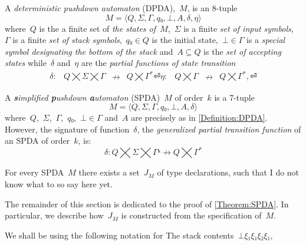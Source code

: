 \begin{Definition}
  \label{Definition:DPDA}
  A \emph{deterministic pushdown automaton} (DPDA),~$M$, is an 8-tuple
  \[
    M =⟨Q,Σ,Γ, q₀,⊥, A,δ,η⟩
  \]
  where~$Q$ is the a finite set of
  \emph{the states of~$M$},~$Σ$ is a finite
  \emph{set of input symbols},~$Γ$ is a finite
  \emph{set of stack symbols},~$q₀∈Q$ is the initial state,~$⊥∈Γ$
  is a \emph{special symbol designating the bottom of the stack}
  and~$A⊆Q$ is the \emph{set of accepting states} while~$δ$ and~$η$ are
  the \emph{partial functions of state transition}
  \[
    \begin{array}{crlc}
      δ: & Q⨉Σ⨉Γ &↛& Q⨉Γ^*⏎
      η: & Q⨉Γ &↛& Q⨉Γ^*,⏎
    \end{array}
  \]
\end{Definition}

\begin{Definition}
  \label{Definition:SPDA}
  A \emph{\textbf simplified \textbf pushdown \textbf automaton} (SPDA)~$M$ of order~$k$ is a 7-tuple
  \[
    M =⟨Q,Σ,Γ,q₀,⊥, A,δ⟩
  \]
  where~$Q$,~$Σ$,~$Γ$,~$q₀$,~$⊥∈Γ$ and~$A$ are precisely as in \cref{Definition:DPDA}.
  However, the signature of function~$δ$, the \emph{generalized partial transition function}
  of an SPDA of order~$k$, is:
  \begin{equation}
    \label{Equation:generalized:transition}
      δ: Q⨉Σ⨉Γᵏ↛Q⨉Γ^*
    \end{equation}
\end{Definition}

\begin{Theorem}
  \label{Theorem:SPDA}
  For every SPDA~$M$ there exists a set~$J_M$ of \Java type declarations, such that
    I do not know what to so say here yet.
\end{Theorem}

The remainder of this section is dedicated to the proof of \cref{Theorem:SPDA}.
In particular, we describe how~$J_M$ is constructed from the
  specification of~$M$.

We shall be using the following notation for
The stack contents~$⊥ξ₁ξ₁ξ₂ξ₁$,

